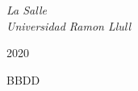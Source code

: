\begin{titlepage}
	\textit{La Salle \\ Universidad Ramon Llull} %
	
	\vfill %
	
	
	
	\vspace{0.3\baselineskip} %
	
	2020 %
	
	{\large BBDD} %

\end{titlepage}



